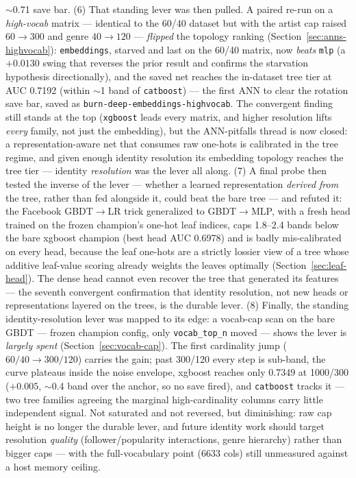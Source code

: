 \documentclass[11pt]{article}
\begin{document}
$\sim$0.71 save bar. (6) That standing lever was then pulled. A paired re-run on a
\emph{high-vocab} matrix --- identical to the 60/40 dataset but with the artist
cap raised $60\to300$ and genre $40\to120$ --- \emph{flipped} the topology
ranking (Section~\ref{sec:anns-highvocab}): \texttt{embeddings}, starved and
last on the 60/40 matrix, now \emph{beats} \texttt{mlp} (a $+0.0130$ swing that
reverses the prior result and confirms the starvation hypothesis directionally),
and the saved net reaches the in-dataset tree tier at AUC \num{0.7192} (within
$\sim$1 band of \texttt{catboost}) --- the first ANN to clear the rotation save
bar, saved as \texttt{burn-deep-embeddings-highvocab}. The convergent finding
still stands at the top (\texttt{xgboost} leads every matrix, and higher
resolution lifts \emph{every} family, not just the embedding), but the
ANN-pitfalls thread is now closed: a representation-aware net that consumes raw
one-hots is calibrated in the tree regime, and given enough identity resolution
its embedding topology reaches the tree tier --- identity \emph{resolution} was
the lever all along.
(7) A final probe then tested the inverse of the lever --- whether a learned representation \emph{derived from} the tree, rather than fed alongside it, could beat the bare tree --- and refuted it: the Facebook GBDT$\to$LR trick generalized to GBDT$\to$MLP, with a fresh head trained on the frozen champion's one-hot leaf indices, caps \num{1.8}--\num{2.4} bands below the bare xgboost champion (best head AUC \num{0.6978}) and is badly mis-calibrated on every head, because the leaf one-hots are a strictly lossier view of a tree whose additive leaf-value scoring already weights the leaves optimally (Section~\ref{sec:leaf-head}). The dense head cannot even recover the tree that generated its features --- the seventh convergent confirmation that identity resolution, not new heads or representations layered on the trees, is the durable lever.
(8) Finally, the standing identity-resolution lever was mapped to its edge: a vocab-cap scan on the bare GBDT --- frozen champion config, only \texttt{vocab\_top\_n} moved --- shows the lever is \emph{largely spent} (Section~\ref{sec:vocab-cap}). The first cardinality jump ($60/40\to300/120$) carries the gain; past 300/120 every step is sub-band, the curve plateaus inside the noise envelope, xgboost reaches only \num{0.7349} at 1000/300 ($+0.005$, $\sim$0.4 band over the anchor, so no save fired), and \texttt{catboost} tracks it --- two tree families agreeing the marginal high-cardinality columns carry little independent signal. Not saturated and not reversed, but diminishing: raw cap height is no longer the durable lever, and future identity work should target resolution \emph{quality} (follower/popularity interactions, genre hierarchy) rather than bigger caps --- with the full-vocabulary point (6633 cols) still unmeasured against a host memory ceiling.
\end{document}

